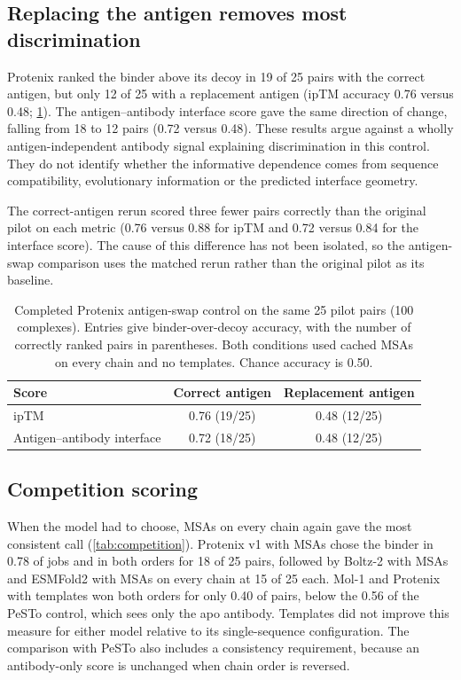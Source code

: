 \documentclass[11pt,a4paper]{article}
\begin{document}
\subsection{Replacing the antigen removes most discrimination}
\label{sec:swap-results}

Protenix ranked the binder above its decoy in 19 of 25 pairs with the correct antigen, but only 12 of 25 with a replacement antigen (ipTM accuracy 0.76 versus 0.48; \cref{tab:swap}).
The antigen--antibody interface score gave the same direction of change, falling from 18 to 12 pairs (0.72 versus 0.48).
These results argue against a wholly antigen-independent antibody signal explaining discrimination in this control.
They do not identify whether the informative dependence comes from sequence compatibility, evolutionary information or the predicted interface geometry.

The correct-antigen rerun scored three fewer pairs correctly than the original pilot on each metric (0.76 versus 0.88 for ipTM and 0.72 versus 0.84 for the interface score).
The cause of this difference has not been isolated, so the antigen-swap comparison uses the matched rerun rather than the original pilot as its baseline.

\begin{table}[ht]
\centering
\caption{Completed Protenix antigen-swap control on the same 25 pilot pairs (100 complexes). Entries give binder-over-decoy accuracy, with the number of correctly ranked pairs in parentheses. Both conditions used cached MSAs on every chain and no templates. Chance accuracy is 0.50.}
\label{tab:swap}
\begin{tabular}{@{}lcc@{}}
\toprule
Score & Correct antigen & Replacement antigen \\
\midrule
ipTM & 0.76 (19/25) & 0.48 (12/25) \\
Antigen--antibody interface & 0.72 (18/25) & 0.48 (12/25) \\
\bottomrule
\end{tabular}
\end{table}

\subsection{Competition scoring}

When the model had to choose, MSAs on every chain again gave the most consistent call (\cref{tab:competition}).
Protenix v1 with MSAs chose the binder in 0.78 of jobs and in both orders for 18 of 25 pairs, followed by Boltz-2 with MSAs and ESMFold2 with MSAs on every chain at 15 of 25 each.
Mol-1 and Protenix with templates won both orders for only 0.40 of pairs, below the 0.56 of the PeSTo control, which sees only the apo antibody.
Templates did not improve this measure for either model relative to its single-sequence configuration.
The comparison with PeSTo also includes a consistency requirement, because an antibody-only score is unchanged when chain order is reversed.
\end{document}

